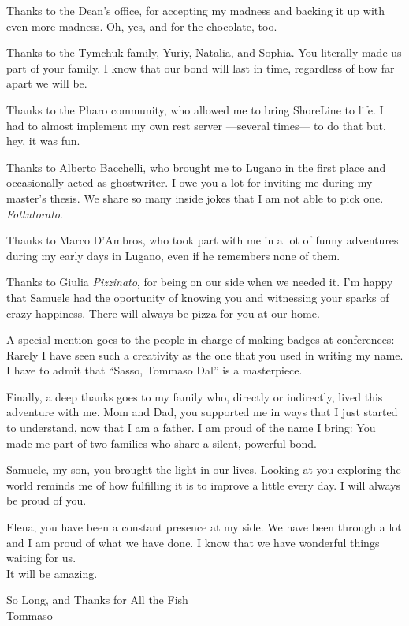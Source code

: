 \begin{acknowledgements}
Thanks to the Dean's office, for accepting my madness and backing it up with even more madness.
Oh, yes, and for the chocolate, too.

Thanks to the Tymchuk family, Yuriy, Natalia, and Sophia.
You literally made us part of your family.
I know that our bond will last in time, regardless of how far apart we will be.

Thanks to the Pharo community, who allowed me to bring ShoreLine to life.
I had to almost implement my own rest server ---several times--- to do that but, hey, it was fun.

Thanks to Alberto Bacchelli, who brought me to Lugano in the first place and occasionally acted as ghostwriter.
I owe you a lot for inviting me during my master's thesis.
We share so many inside jokes that I am not able to pick one. \emph{Fottutorato}.

Thanks to Marco D'Ambros, who took part with me in a lot of funny adventures during my early days in Lugano, even if he remembers none of them.

Thanks to Giulia \emph{Pizzinato}, for being on our side when we needed it.
I'm happy that Samuele had the oportunity of knowing you and witnessing your sparks of crazy happiness.
There will always be pizza for you at our home.

A special mention goes to the people in charge of making badges at conferences: Rarely I have seen such a creativity as the one that you used in writing my name.
I have to admit that ``Sasso, Tommaso Dal'' is a masterpiece.

Finally, a deep thanks goes to my family who, directly or indirectly, lived this adventure with me.
Mom and Dad, you supported me in ways that I just started to understand, now that I am a father.
I am proud of the name I bring: You made me part of two families who share a silent, powerful bond.

Samuele, my son, you brought the light in our lives.
Looking at you exploring the world reminds me of how fulfilling it is to improve a little every day.
I will always be proud of you.

Elena, you have been a constant presence at my side.
We have been through a lot and I am proud of what we have done.
I know that we have wonderful things waiting for us.
\\It will be amazing.


\begin{flushright}
So Long, and Thanks for All the Fish\\
Tommaso
\end{flushright}

\end{acknowledgements}
